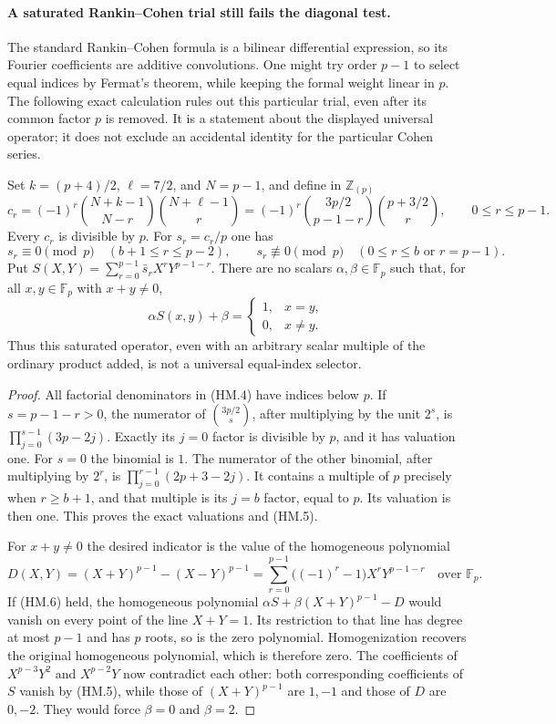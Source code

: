 \paragraph{A saturated Rankin--Cohen trial still fails the diagonal test.}
The standard Rankin--Cohen formula is a bilinear differential expression,
so its Fourier coefficients are additive convolutions.  One might try
order $p-1$ to select equal indices by Fermat's theorem, while keeping
the formal weight linear in $p$.  The following exact calculation rules
out this particular trial, even after its common factor $p$ is removed.
It is a statement about the displayed universal operator; it does not
exclude an accidental identity for the particular Cohen series.

\begin{proposition}
Set $k=(p+4)/2$, $\ell=7/2$, and $N=p-1$, and define in
$\mathbb Z_{(p)}$
\[
 c_r=(-1)^r\binom{N+k-1}{N-r}\binom{N+\ell-1}{r}
     =(-1)^r\binom{3p/2}{p-1-r}\binom{p+3/2}{r},
 \qquad 0\le r\le p-1.
 \tag{HM.4}
\]
Every $c_r$ is divisible by $p$.  For $s_r=c_r/p$ one has
\[
 s_r\equiv0\pmod p\quad(b+1\le r\le p-2),
 \qquad
 s_r\not\equiv0\pmod p\quad(0\le r\le b\text{ or }r=p-1).
 \tag{HM.5}
\]
Put $S(X,Y)=\sum_{r=0}^{p-1}\bar s_rX^rY^{p-1-r}$.
There are no scalars $\alpha,\beta\in\mathbb F_p$ such that, for all
$x,y\in\mathbb F_p$ with $x+y\ne0$,
\[
 \alpha S(x,y)+\beta=\begin{cases}1,&x=y,\\0,&x\ne y.\end{cases}
 \tag{HM.6}
\]
Thus this saturated operator, even with an arbitrary scalar multiple
of the ordinary product added, is not a universal equal-index selector.
\end{proposition}

\begin{proof}
All factorial denominators in (HM.4) have indices below $p$.
If $s=p-1-r>0$, the numerator of $\binom{3p/2}{s}$, after multiplying
by the unit $2^s$, is
$\prod_{j=0}^{s-1}(3p-2j)$.  Exactly its $j=0$ factor is divisible by
$p$, and it has valuation one.  For $s=0$ the binomial is $1$.
The numerator of the other binomial, after multiplying by $2^r$, is
$\prod_{j=0}^{r-1}(2p+3-2j)$.  It contains a multiple of $p$ precisely
when $r\ge b+1$, and that multiple is its $j=b$ factor, equal to $p$.
Its valuation is then one.  This proves the exact valuations and (HM.5).

For $x+y\ne0$ the desired indicator is the value of the homogeneous
polynomial
\[
 D(X,Y)=(X+Y)^{p-1}-(X-Y)^{p-1}
       =\sum_{r=0}^{p-1}\bigl((-1)^r-1\bigr)X^rY^{p-1-r}
       \quad\text{over }\mathbb F_p.
 \tag{HM.7}
\]
If (HM.6) held, the homogeneous polynomial
$\alpha S+\beta(X+Y)^{p-1}-D$ would vanish on every point of the line
$X+Y=1$.  Its restriction to that line has degree at most $p-1$ and
has $p$ roots, so is the zero polynomial.  Homogenization recovers the
original homogeneous polynomial, which is therefore zero.
The coefficients of $X^{p-3}Y^2$ and $X^{p-2}Y$ now contradict each
other: both corresponding coefficients of $S$ vanish by (HM.5), while
those of $(X+Y)^{p-1}$ are $1,-1$ and those of $D$ are $0,-2$.
They would force $\beta=0$ and $\beta=2$.
\end{proof}

